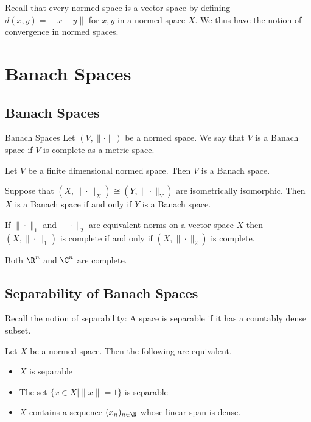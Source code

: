 \documentclass[a4paper]{article}
\begin{document}
Recall that every normed space is a vector space by defining $d(x,y)=\|x-y\|$ for $x,y$ in a normed space $X$. We thus have the notion of convergence in normed spaces. 

\pagebreak
\section{Banach Spaces}
\subsection{Banach Spaces}
\begin{defn}{Banach Spaces}{} Let $(V,\|\cdot\|)$ be a normed space. We say that $V$ is a Banach space if $V$ is complete as a metric space. 
\end{defn}

\begin{prp}{}{} Let $V$ be a finite dimensional normed space. Then $V$ is a Banach space. 
\end{prp}

\begin{lmm}{}{} Suppose that $(X,\|\cdot\|_X)\cong(Y,\|\cdot\|_Y)$ are isometrically isomorphic. Then $X$ is a Banach space if and only if $Y$ is a Banach space. 
\end{lmm}

\begin{lmm}{}{} If $\|\cdot\|_1$ and $\|\cdot\|_2$ are equivalent norms on a vector space $X$ then $(X,\|\cdot\|_1)$ is complete if and only if $(X,\|\cdot\|_2)$ is complete. 
\end{lmm}

\begin{prp}{}{} Both $\R^n$ and $\C^n$ are complete. 
\end{prp}

\subsection{Separability of Banach Spaces}
Recall the notion of separability: A space is separable if it has a countably dense subset. 

\begin{lmm}{}{} Let $X$ be a normed space. Then the following are equivalent. 
\begin{itemize}
\item $X$ is separable
\item The set $\{x\in X|\|x\|=1\}$ is separable
\item $X$ contains a sequence $(x_n)_{n\in\N}$ whose linear span is dense. 
\end{itemize}
\end{lmm}
\end{document}
